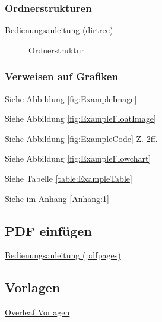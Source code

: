 \documentclass[a4paper, 11pt]{article}
\begin{document}
\subsubsection{Ordnerstrukturen}

\href{https://de.mirrors.cicku.me/ctan/macros/generic/dirtree/dirtree.pdf}{Bedienungsanleitung (dirtree)}

\par\medskip
\begin{figure}[!ht]
\caption[Ordnerstruktur im Abbildungsverzeichnis]{Ordnerstruktur}
\label{fig:JSONStruct}
\end{figure}
\newpage

\subsubsection{Verweisen auf Grafiken}

Siehe Abbildung \ref{fig:ExampleImage}

Siehe Abbildung \ref{fig:ExampleFloatImage}

Siehe Abbildung \ref{fig:ExampleCode} Z. 2ff.

Siehe Abbildung \ref{fig:ExampleFlowchart}

Siehe Tabelle \ref{table:ExampleTable}

Siehe im Anhang \ref{Anhang:1}
\newpage

\subsection{PDF einfügen}

\href{https://texdoc.org/serve/pdfpages.pdf/0}{Bedienungsanleitung (pdfpages)}
%
\newpage

\subsection{Vorlagen}

\href{https://de.overleaf.com/latex/templates}{Overleaf Vorlagen}

\newpage


\setcounter{page}{\value{savepage}}
\end{document}

